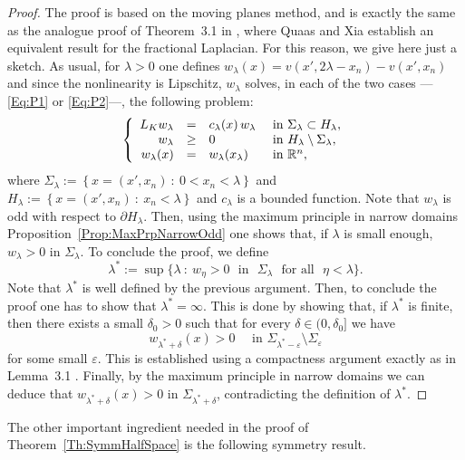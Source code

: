 \begin{proof}
	The proof is based on the moving planes method, and is exactly the same as the analogue proof of Theorem~3.1 in \cite{QuaasXia}, where Quaas and Xia establish an equivalent result for the fractional Laplacian. For this reason, we give here just a sketch. As usual, for $\lambda > 0$ one defines $w_\lambda (x) = v(x',2\lambda - x_n)-v(x',x_n)$ and since the nonlinearity is Lipschitz, $w_\lambda$ solves, in each of the two cases ---\eqref{Eq:P1} or \eqref{Eq:P2}---, the following problem:
	$$
	\left\{\begin{array}{rcll} 
	L_K  w_\lambda &=& c_\lambda(x)\,w_\lambda  &\textrm{ in } \Sigma_\lambda\subset H_\lambda,\\ 
	w_\lambda &\geq& 0 &\textrm{ in } H_\lambda\setminus\Sigma_\lambda,\\ 
	w_\lambda(x) &=& w_\lambda(x_\lambda) &\textrm{ in } \mathbb{R}^n, 
	\end{array} \right. 
	$$
	where $\Sigma_\lambda := \left\{ x = (x',x_n) \ : \ 0<x_n<\lambda \right\}$ and $H_\lambda := \left\{ x = (x',x_n) \ : \ x_n<\lambda \right\}$ and $c_\lambda$ is a bounded function. Note that $w_\lambda$ is odd with respect to $\partial H_\lambda$. Then, using the maximum principle in narrow domains  Proposition~\ref{Prop:MaxPrpNarrowOdd} one shows that, if $\lambda$ is small enough, $w_\lambda>0$ in $\Sigma_\lambda$. To conclude the proof, we define
	$$
	\lambda^* := \sup\{\lambda \ : \ w_\eta>0 \,\, \text{ in } \,\, \Sigma_\lambda \,\, \text{ for all } \,\, \eta<\lambda\}.
	$$
	Note that $\lambda^*$ is well defined by the previous argument. Then, to conclude the proof one has to show that $\lambda^*=\infty$. This is done by showing that, if $\lambda^*$ is finite, then there exists a small $\delta_0 > 0$ such that for every $\delta \in (0,\delta_0]$ we have
	$$
	w_{\lambda^* +  \delta} (x) > 0 \quad \text{ in } \Sigma_{\lambda^*-\varepsilon}\setminus \Sigma_{\varepsilon}
	$$
	for some small $\varepsilon$.
	This is established using a compactness argument exactly as in Lemma~3.1 \cite{QuaasXia}. Finally, by the maximum principle in narrow domains we can deduce that $w_{\lambda^* +  \delta} (x) > 0 $ in $\Sigma_{\lambda^*+\delta}$, contradicting the definition of $\lambda^*$.
\end{proof}








The other important ingredient needed in the proof of Theorem~\ref{Th:SymmHalfSpace} is the following symmetry result.

